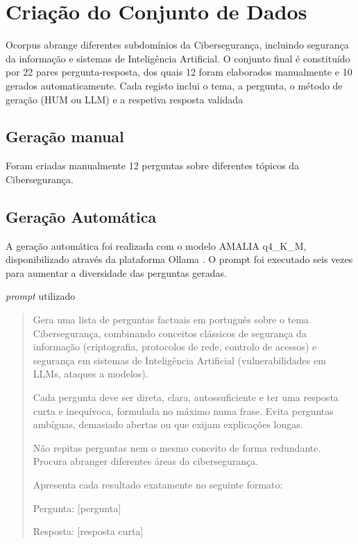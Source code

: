 \section{Criação do Conjunto de Dados}
\label{sec:criacao_dados}

Ocorpus abrange diferentes subdomínios da Cibersegurança, incluindo segurança da informação e sistemas de Inteligência Artificial. O conjunto final é constituído por 22 pares pergunta-resposta, dos quais 12 foram elaborados manualmente e 10 gerados automaticamente. Cada registo inclui o tema, a pergunta, o método de geração (HUM ou LLM) e a respetiva resposta validada

\subsection{ Geração manual}
Foram criadas manualmente 12 perguntas sobre diferentes tópicos da Cibersegurança.

\subsection{Geração Automática}
\label{sec:geracao_automatica}
A geração automática foi realizada com o modelo AMALIA q4\_K\_M, disponibilizado através da plataforma Ollama \cite{amalia_ollama}.
O prompt foi executado seis vezes  para aumentar a diversidade das perguntas geradas.

\textit{prompt} utilizado

\begin{quote}
\small
Gera uma lista de perguntas factuais em português sobre o tema Cibersegurança,
combinando conceitos clássicos de segurança da informação (criptografia,
protocolos de rede, controlo de acessos) e segurança em sistemas de Inteligência
Artificial (vulnerabilidades em LLMs, ataques a modelos).

Cada pergunta deve ser direta, clara, autossuficiente e ter uma resposta curta e
inequívoca, formulada no máximo numa frase. Evita perguntas ambíguas, demasiado
abertas ou que exijam explicações longas.

Não repitas perguntas nem o mesmo conceito de forma redundante. Procura abranger diferentes áreas da cibersegurança.

Apresenta cada resultado exatamente no seguinte formato:

Pergunta: [pergunta]

Resposta: [resposta curta]
\end{quote}


